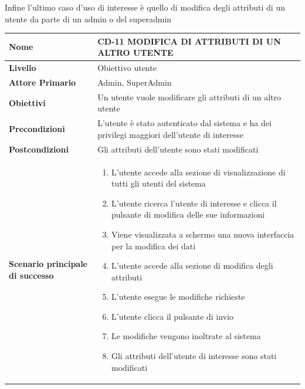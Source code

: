 Infine l'ultimo caso d'uso di interesse è quello di modifica degli attributi di un utente da parte di un admin o del superadmin

\begin{center}
    \begin{tabular}{|p{0.3\linewidth}|p{0.7\linewidth}|}
    \hline
    \rowcolor{Blue}
    \textbf{Nome} & CD-11 MODIFICA DI ATTRIBUTI DI UN ALTRO UTENTE \\
    \hline
    \rowcolor{DarkBlue}
    \textbf{Livello} & Obiettivo utente \\
    \hline
    \rowcolor{LightBlue}
    \textbf{Attore Primario} & Admin, SuperAdmin \\
    \hline
    \rowcolor{LightBlue}
    \textbf{Obiettivi} & Un utente vuole modificare gli attributi di un altro utente \\
    \hline
    \rowcolor{Blue}
    \textbf{Precondizioni} & L’utente è stato autenticato dal sistema e ha dei privilegi maggiori dell’utente di interesse \\
    \hline
    \rowcolor{LightBlue}
    \textbf{Postcondizioni} & Gli attributi dell’utente sono stati modificati \\
    \hline
    \rowcolor{LighterBlue}
        \begin{center}
        \textbf{Scenario principale di successo}
    \end{center} 
    &
    \begin{enumerate}
        \item L’utente accede alla sezione di visualizzazione di tutti gli utenti del sistema
        \item L’utente ricerca l’utente di interesse e clicca il pulsante di modifica delle sue informazioni
        \item Viene visualizzata a schermo una nuova interfaccia per la modifica dei dati
        \item L’utente accede alla sezione di modifica degli attributi
        \item L’utente esegue le modifiche richieste
        \item L’utente clicca il pulsante di invio
        \item Le modifiche vengono inoltrate al sistema
        \item Gli attributi dell’utente di interesse sono stati modificati
    \end{enumerate}
    \\
    \hline
    \end{tabular}
\end{center}

